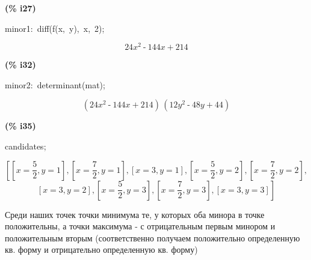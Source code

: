 \documentclass[a4paper, 12pt]{article}
\begin{document}
\begin{minipage}[t]{4.000000em}\color{red}\bfseries
(\% i27)	
\end{minipage}
\begin{minipage}[t]{\textwidth}\color{blue}
minor1:\ diff(f(x,\ y),\ x,\ 2);
\end{minipage}
\[\displaystyle \tag{minor1} 
24 {{x}^{2}}\operatorname{-}144 x\operatorname{+}214\mbox{}
\]


\noindent
\begin{minipage}[t]{4.000000em}\color{red}\bfseries
(\% i32)	
\end{minipage}
\begin{minipage}[t]{\textwidth}\color{blue}
minor2:\ determinant(mat);
\end{minipage}
\[\displaystyle \tag{minor2} 
\left( 24 {{x}^{2}}\operatorname{-}144 x\operatorname{+}214\right) \, \left( 12 {{y}^{2}}\operatorname{-}48 y\operatorname{+}44\right) \mbox{}
\]


\noindent
\begin{minipage}[t]{4.000000em}\color{red}\bfseries
(\% i35)	
\end{minipage}
\begin{minipage}[t]{\textwidth}\color{blue}
candidates;
\end{minipage}
\[\displaystyle \tag{\% o35} 
\operatorname{[}\left[ x\operatorname{=}\frac{5}{2}\operatorname{,}y\operatorname{=}1\right] \operatorname{,}\left[ x\operatorname{=}\frac{7}{2}\operatorname{,}y\operatorname{=}1\right] \operatorname{,}\left[ x\operatorname{=}3\operatorname{,}y\operatorname{=}1\right] \operatorname{,
}\left[ x\operatorname{=}\frac{5}{2}\operatorname{,}y\operatorname{=}2\right] \operatorname{,}\left[ x\operatorname{=}\frac{7}{2}\operatorname{,}y\operatorname{=}2\right] \operatorname{,}\]
\[\left[ x\operatorname{=}3\operatorname{,}y\operatorname{=}2\right] \operatorname{,}\left[ x\operatorname{=}\frac{5}{2}\operatorname{,}y\operatorname{=}3\right] \operatorname{,
}\left[ x\operatorname{=}\frac{7}{2}\operatorname{,}y\operatorname{=}3\right] \operatorname{,}\left[ x\operatorname{=}3\operatorname{,}y\operatorname{=}3\right] \operatorname{]}\mbox{}
\]


\noindent
Среди наших точек точки минимума те, у которых оба минора в точке положительны, а точки максимума - с отрицательным первым минором и положительным вторым (соответственно получаем положительно определенную кв. форму и отрицательно определенную кв. форму)
\end{document}
